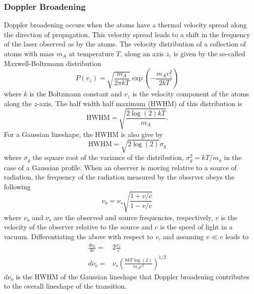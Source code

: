 \subsubsection{Doppler Broadening}
Doppler broadening occurs when the atoms have a thermal velocity spread along the direction of propagation. This velocity spread leads to a shift in the frequency of the laser observed as by the atoms. The velocity distribution of a collection of atoms with mass $m_A$ at temperature $T$, along an axis $z$, is given by the so-called Maxwell-Boltzmann distribution \cite{thermal}
\begin{equation}
P(v_z) = \sqrt{\frac{m_A}{2 \pi kT}}\exp\left(-\frac{m_Av_z^2}{2kT}\right)
\label{MBD}
\end{equation}
\noindent where $k$ is the Boltzmann constant and $v_z$ is the velocity component of the atoms along the $z$-axis. The half width half maximum (HWHM) of this distribution is
\begin{equation}
\mathrm{HWHM} = \sqrt{\frac{2\log{(2)}kT}{m_A}}.
\end{equation}
For a Gaussian lineshape, the HWHM is also give by
\begin{equation}
\mathrm{HWHM} = \sqrt{2\log(2)}\sigma_g
\end{equation}
where $\sigma_g$ the square root of the variance of the distribution, $\sigma_g^2 = kT/m_a$ in the case of a Gaussian profile. When an observer is moving relative to a source of radiation, the frequency of the radiation measured by the observer obeys the following\cite{landau1975}
\begin{equation}
\nu_o = \nu_s\sqrt{\frac{1+v/c}{1-v/c}}
\label{dop_shift}
\end{equation}
where $\nu_o$ and $\nu_s$ are the observed and source frequencies, respectively, $v$ is the velocity of the observer relative to the source and $c$ is the speed of light in a vacuum. Differentiating the above with respect to $v$, and assuming $v\ll c$ leads to
\begin{align*}
\frac{d\nu_o}{dv} =& 2\frac{\nu_s}{c}\\ \nonumber
d\nu_o =& \nu_s\left(\frac{8kT\log(2)}{m_Ac^2}\right)^{1/2}
\end{align*}
\label{temp_width}
$d\nu_o$ is the HWHM of the Gaussian lineshape that Doppler broadening contributes to the overall lineshape of the transition\cite{TomT}.


